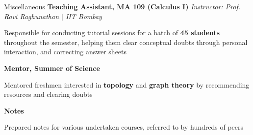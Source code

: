 \begin{rubric}{Miscellaneous}
    \entry*[2020] \textbf{Teaching Assistant, MA 109 (Calculus I)} \hfill \emph{Instructor: Prof. Ravi Raghunathan $\mid$ IIT Bombay}
	    
	    Responsible for conducting tutorial sessions for a batch of \textbf{45 students} throughout the semester, helping them clear conceptual doubts through personal interaction, and correcting answer sheets

	\entry*[2021] \textbf{Mentor, Summer of Science}

		Mentored freshmen interested in \textbf{topology} and \textbf{graph theory} by recommending resources and clearing doubts

	\entry*[2020--2022] \textbf{Notes}

		Prepared notes for various undertaken courses, referred to by hundreds of peers


\end{rubric}